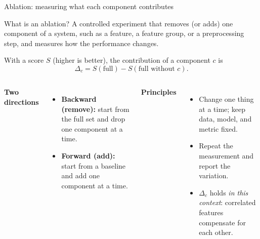 \begin{frame}{Ablation: measuring what each component contributes}
\begin{block}{What is an ablation?}\small
A controlled experiment that removes (or adds) one component of a system, such as a feature, a feature group, or a preprocessing step, and measures how the performance changes.
\end{block}
\footnotesize
With a score $S$ (higher is better), the contribution of a component $c$ is
\[
\Delta_c = S(\text{full}) - S(\text{full without } c).
\]
\begin{columns}[T]
\textbf{Two directions}
\begin{itemize}\footnotesize
\item \textbf{Backward (remove):} start from the full set and drop one component at a time.
\item \textbf{Forward (add):} start from a baseline and add one component at a time.
\end{itemize}
\textbf{Principles}
\begin{itemize}\footnotesize
\item Change one thing at a time; keep data, model, and metric fixed.
\item Repeat the measurement and report the variation.
\item $\Delta_c$ holds \emph{in this context}: correlated features compensate for each other.
\end{itemize}
\end{columns}
\coursefooter
\end{frame}
